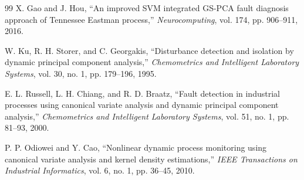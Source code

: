 \documentclass[10pt,twocolumn,a4paper]{article}
\begin{document}
\begin{thebibliography}{99}
X. Gao and J. Hou, ``An improved SVM integrated GS-PCA fault diagnosis approach
of Tennessee Eastman process,'' \emph{Neurocomputing}, vol. 174, pp. 906--911,
2016.

W. Ku, R. H. Storer, and C. Georgakis, ``Disturbance detection and isolation by
dynamic principal component analysis,'' \emph{Chemometrics and Intelligent
Laboratory Systems}, vol. 30, no. 1, pp. 179--196, 1995.

E. L. Russell, L. H. Chiang, and R. D. Braatz, ``Fault detection in industrial
processes using canonical variate analysis and dynamic principal component
analysis,'' \emph{Chemometrics and Intelligent Laboratory Systems}, vol. 51,
no. 1, pp. 81--93, 2000.

P. P. Odiowei and Y. Cao, ``Nonlinear dynamic process monitoring using
canonical variate analysis and kernel density estimations,'' \emph{IEEE
Transactions on Industrial Informatics}, vol. 6, no. 1, pp. 36--45, 2010.

\end{thebibliography}
\end{document}
